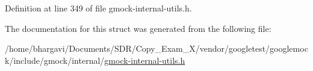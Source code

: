Definition at line 349 of file gmock-\/internal-\/utils.\+h.



The documentation for this struct was generated from the following file\+:\begin{DoxyCompactItemize}
\item 
/home/bhargavi/\+Documents/\+S\+D\+R/\+Copy\+\_\+\+Exam\+\_\+X/vendor/googletest/googlemock/include/gmock/internal/\hyperlink{gmock-internal-utils_8h}{gmock-\/internal-\/utils.\+h}\end{DoxyCompactItemize}
